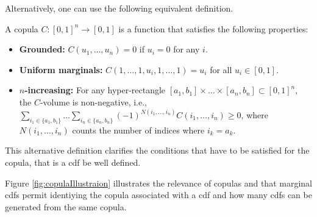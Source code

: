 Alternatively, one can use the following equivalent definition.
\begin{definition}
\label{def:copula_alternative}
 A copula $C : [0,1]^n \to [0,1]$ is a function that satisfies the following properties:
\begin{itemize}
\item \textbf{Grounded:} $C(u_1,\ldots,u_n) = 0$ if $u_i = 0$ for any $i$.
\item \textbf{Uniform marginals:} $C(1,\ldots,1,u_i,1,\ldots,1) = u_i$ for all $u_i \in [0,1]$.
\item \textbf{$n$-increasing:} For any hyper-rectangle $[a_1,b_1] \times \ldots \times [a_n,b_n] \subset [0,1]^n$, the $C$-volume is non-negative, i.e., $\sum_{i_1 \in \{a_1, b_1\}} \ldots \sum_{i_n \in \{a_n, b_n\}} (-1)^{N(i_1, \ldots, i_n)} C(i_1, \ldots, i_n) \geq 0$, where $N(i_1, \ldots, i_n)$ counts the number of indices where $i_k = a_k$.
\end{itemize}
\end{definition}
This alternative definition clarifies the conditions that have to be satisfied for the copula, that is a cdf be well defined.

Figure \ref{fig:copulaIllustraion} illustrates the relevance of copulas and that marginal cdfs permit identiying the copula associated with a cdf and how many cdfs can be generated from the same copula.

